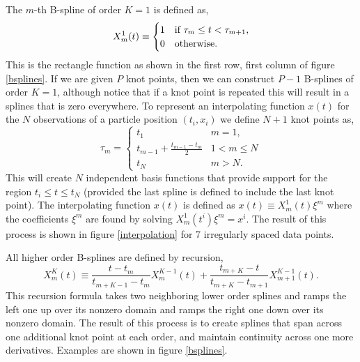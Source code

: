 \documentclass[twocol]{ametsoc}
\begin{document}
The $m$-th B-spline of order $K=1$ is defined as,
\begin{equation}
X^1_m(t) \equiv \begin{cases}
1      & \text{if $ \tau_m \leq t < \tau_{m+1}$}, \\
0     & \text{otherwise}.
\end{cases}
\end{equation}
This is the rectangle function as shown in the first row, first column of figure \ref{bsplines}. If we are given $P$ knot points, then we can construct $P-1$ B-splines of order $K=1$, although notice that if a knot point is repeated this will result in a splines that is zero everywhere. To represent an interpolating function $x(t)$ for the $N$ observations of a particle position $(t_i,x_i)$ we define $N+1$ knot points as,
\begin{equation}
\tau_m = \begin{cases}
t_1      & \text{$m=1$}, \\
t_{m-1} + \frac{t_{m-1}-t_m}{2}	  & \text{$1<m \leq N$}\\
t_N     & \text{$m>N$}.
\end{cases}
\end{equation}
This will create $N$ independent basis functions that provide support for the region $t_i \leq t \leq t_N$ (provided the last spline is defined to include the last knot point). The interpolating function $x(t)$ is defined as $x(t) \equiv  X^1_m(t) \xi^m$ where the coefficients $\xi^m$ are found by solving $X^1_m(t^i) \xi^m = x^i$. The result of this process is shown in figure \ref{interpolation} for 7 irregularly spaced data points.

All higher order B-splines are defined by recursion,
\begin{equation}
X^K_m(t) \equiv \frac{t - t_m}{t_{m+K-1} - t_m} X^{K-1}_m(t) + \frac{t_{m+K}-t}{t_{m+K} - t_{m+1}} X^{K-1}_{m+1}(t).
\end{equation}
This recursion formula takes two neighboring lower order splines and ramps the left one up over its nonzero domain and ramps the right one down over its nonzero domain. The result of this process is to create splines that span across one additional knot point at each order, and maintain continuity across one more derivatives. Examples are shown in figure \ref{bsplines}.
\end{document}
